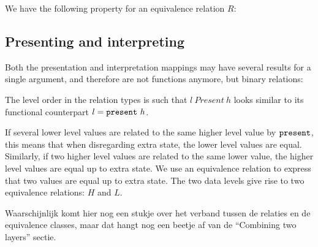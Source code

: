 
We have the following property for an equivalence relation $R$:




\subsection{Presenting and interpreting}

Both the presentation and interpretation mappings may have several results for a single argument, and therefore are not functions anymore, but binary relations: 


The level order in the relation types is such that $l~Present~h$ looks similar to its functional counterpart $l = {\tt present}~h$. 

If several lower level values are related to the same higher level value by ${\tt present}$, this means that when disregarding extra state, the lower level values are equal. Similarly, if two higher level values are related to the same lower value, the higher level values are equal up to extra state. We use an equivalence relation to express that two values are equal up to extra state. The two data levels give rise to two equivalence relations: $H$ and $L$.





\toHere
Waarschijnlijk komt hier nog een stukje over het verband tussen de relaties en de equivalence classes, maar dat hangt nog een beetje af van de ``Combining two layers'' sectie.
\fromHere



